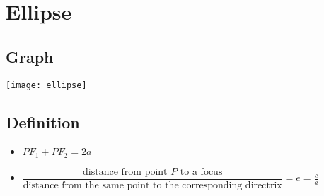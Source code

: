


\section{Ellipse}
\subsection{Graph}
\texttt{[image: ellipse]}\\

\subsection{Definition}
\begin{itemize}
    \item $PF_1 + PF_2 = 2a$
    \item $\dfrac{\text{distance from point $P$ to a focus}}{\text{distance from the same point to the corresponding directrix}}=e=\frac{c}{a}$
\end{itemize}
